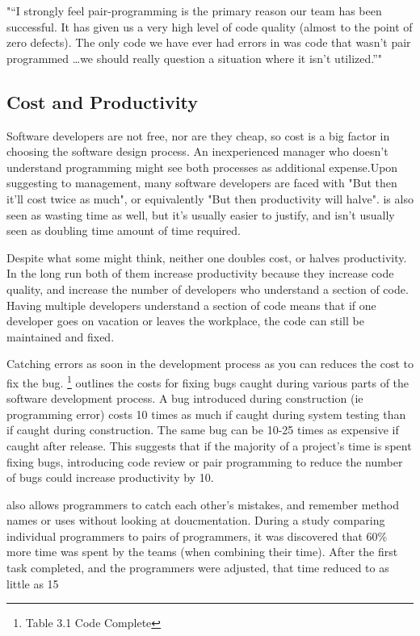\documentclass{article}
\begin{document}
\PP "“I strongly feel pair-programming is the primary reason our team has been successful. It has given us a very high level of code quality (almost to the point of zero defects). The only code we have ever had errors in was code that wasn’t pair programmed \dots we should really question a situation where it isn’t utilized.”"

\subsection{Cost and Productivity}

Software developers are not free, nor are they cheap, so cost is a big factor in choosing the software design process. An inexperienced manager who doesn't understand programming might see both processes as additional expense.Upon suggesting \PP to management, many software developers are faced with "But then it'll cost twice as much", or equivalently "But then productivity will halve". \CR is also seen as wasting time as well, but it's usually easier to justify, and isn't usually seen as doubling time amount of time required.

Despite what some might think, neither one doubles cost, or halves productivity. In the long run both of them increase productivity because they increase code quality, and increase the number of developers who understand a section of code. Having multiple developers understand a section of code means that if one developer goes on vacation or leaves the workplace, the code can still be maintained and fixed.

Catching errors as soon in the development process as you can reduces the cost to fix the bug. \cite{avgCostOfDefect}\footnote{Table 3.1 Code Complete} outlines the costs for fixing bugs caught during various parts of the software development process. A bug introduced during construction (ie programming error) costs 10 times as much if caught during system testing than if caught during construction. The same bug can be 10-25 times as expensive if caught after release. This suggests that if the majority of a project's time is spent fixing bugs, introducing code review or pair programming to reduce the number of bugs could increase productivity by 10.

\PP also allows programmers to catch each other's mistakes, and remember method names or uses without looking at doucmentation. During a study comparing individual programmers to pairs of programmers, it was discovered that 60\% more time was spent by the teams (when combining their time). After the first task completed, and the programmers were adjusted, that time reduced to as little as 15%
\end{document}
